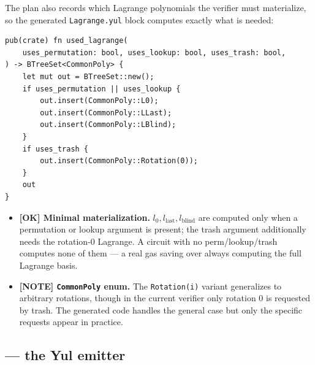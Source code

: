 The plan also records which Lagrange polynomials the verifier must
materialize, so the generated \texttt{Lagrange.yul} block computes
exactly what is needed:
\begin{lstlisting}[style=rust]
pub(crate) fn used_lagrange(
    uses_permutation: bool, uses_lookup: bool, uses_trash: bool,
) -> BTreeSet<CommonPoly> {
    let mut out = BTreeSet::new();
    if uses_permutation || uses_lookup {
        out.insert(CommonPoly::L0);
        out.insert(CommonPoly::LLast);
        out.insert(CommonPoly::LBlind);
    }
    if uses_trash {
        out.insert(CommonPoly::Rotation(0));
    }
    out
}
\end{lstlisting}
\begin{itemize}
  \item \textcolor{tracegreen}{\textbf{[OK] Minimal materialization.}}
        $l_0, l_{\text{last}}, l_{\text{blind}}$ are computed only when
        a permutation or lookup argument is present; the trash argument
        additionally needs the rotation-0 Lagrange. A circuit with no
        perm/lookup/trash computes none of them --- a real gas saving
        over always computing the full Lagrange basis.
  \item \textcolor{mathpurple}{\textbf{[NOTE] \texttt{CommonPoly} enum.}}
        The \texttt{Rotation(i)} variant generalizes to arbitrary
        rotations, though in the current verifier only rotation 0 is
        requested by trash. The generated code handles the general case
        but only the specific requests appear in practice.
\end{itemize}

\subsection{ --- the Yul emitter}
\label{sec:computations}

